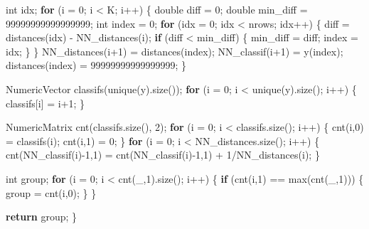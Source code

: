 \documentclass[]{article}
\newenvironment{Shaded}{\begin{snugshade}}{\end{snugshade}}
\newcommand{\ControlFlowTok}[1]{\textcolor[rgb]{0.13,0.29,0.53}{\textbf{#1}}}
\newcommand{\DataTypeTok}[1]{\textcolor[rgb]{0.13,0.29,0.53}{#1}}
\newcommand{\DecValTok}[1]{\textcolor[rgb]{0.00,0.00,0.81}{#1}}
\newcommand{\NormalTok}[1]{#1}
\begin{document}
\begin{Shaded}
\begin{Highlighting}[]
    \DataTypeTok{int}\NormalTok{ idx;}
    \ControlFlowTok{for}\NormalTok{ (i = }\DecValTok{0}\NormalTok{; i < K; i++) \{}
      \DataTypeTok{double}\NormalTok{ diff = }\DecValTok{0}\NormalTok{;}
      \DataTypeTok{double}\NormalTok{ min_diff = }\DecValTok{99999999999999999}\NormalTok{;}
      \DataTypeTok{int}\NormalTok{ index = }\DecValTok{0}\NormalTok{;}
      \ControlFlowTok{for}\NormalTok{ (idx = }\DecValTok{0}\NormalTok{; idx < nrows; idx++) \{}
\NormalTok{        diff = distances(idx) - NN_distances(i);}
        \ControlFlowTok{if}\NormalTok{ (diff < min_diff) \{}
\NormalTok{          min_diff = diff;}
\NormalTok{          index = idx;}
\NormalTok{        \}}
\NormalTok{      \}}
\NormalTok{      NN_distances(i+}\DecValTok{1}\NormalTok{) = distances(index);}
\NormalTok{      NN_classif(i+}\DecValTok{1}\NormalTok{) = y(index);}
\NormalTok{      distances(index) = }\DecValTok{99999999999999999}\NormalTok{;}
\NormalTok{    \}}
    
\NormalTok{    NumericVector classifs(unique(y).size());}
    \ControlFlowTok{for}\NormalTok{ (i = }\DecValTok{0}\NormalTok{; i < unique(y).size(); i++) \{}
\NormalTok{      classifs[i] = i+}\DecValTok{1}\NormalTok{;}
\NormalTok{    \}}

\NormalTok{    NumericMatrix cnt(classifs.size(), }\DecValTok{2}\NormalTok{);}
    \ControlFlowTok{for}\NormalTok{ (i = }\DecValTok{0}\NormalTok{; i < classifs.size(); i++) \{}
\NormalTok{      cnt(i,}\DecValTok{0}\NormalTok{) = classifs(i);}
\NormalTok{      cnt(i,}\DecValTok{1}\NormalTok{) = }\DecValTok{0}\NormalTok{;}
\NormalTok{    \}}
    \ControlFlowTok{for}\NormalTok{ (i = }\DecValTok{0}\NormalTok{; i < NN_distances.size(); i++) \{}
\NormalTok{      cnt(NN_classif(i)-}\DecValTok{1}\NormalTok{,}\DecValTok{1}\NormalTok{) = cnt(NN_classif(i)-}\DecValTok{1}\NormalTok{,}\DecValTok{1}\NormalTok{) + }\DecValTok{1}\NormalTok{/NN_distances(i);}
\NormalTok{    \}}

    \DataTypeTok{int}\NormalTok{ group;}
    \ControlFlowTok{for}\NormalTok{ (i = }\DecValTok{0}\NormalTok{; i < cnt(_,}\DecValTok{1}\NormalTok{).size(); i++) \{}
      \ControlFlowTok{if}\NormalTok{ (cnt(i,}\DecValTok{1}\NormalTok{) == max(cnt(_,}\DecValTok{1}\NormalTok{))) \{}
\NormalTok{        group = cnt(i,}\DecValTok{0}\NormalTok{);}
\NormalTok{      \}}
\NormalTok{    \}}

  \ControlFlowTok{return}\NormalTok{ group;}
\NormalTok{\}}
\end{Highlighting}
\end{Shaded}
\end{document}
